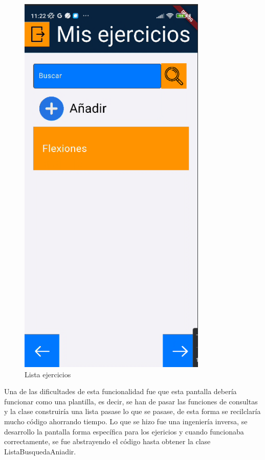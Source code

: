 \begin{figure}[H]
   \centering
    \includegraphics[width=0.8\textwidth]{pantallas/listaEjercicios.png}
    \caption{Lista ejercicios}
    \label{fig:ListaEjer}
\end{figure}

Una de las dificultades de esta funcionalidad fue que esta pantalla debería funcionar como una plantilla, es decir, se han de pasar las funciones de consultas y la clase construiría una lista pasase lo que se pasase, de esta forma se recilclaría mucho código ahorrando tiempo. Lo que se hizo fue una ingeniería inversa, se desarrollo la pantalla forma específica para los ejericios y cuando funcionaba correctamente, se fue abstrayendo el código hasta obtener la clase ListaBusquedaAniadir.

